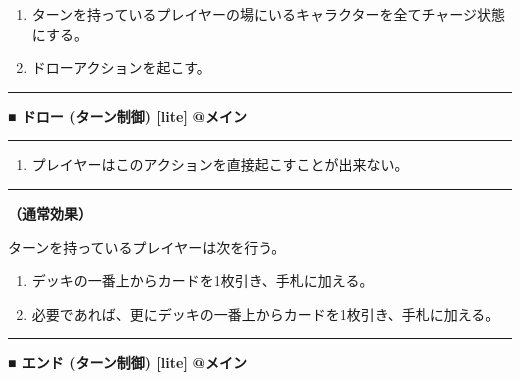 \documentclass[twocolumn,a5paper,papersize,10pt]{jarticle}
\begin{document}
\vspace{-1zh}%
\begin{enumerate}
\setlength{\leftskip}{-0.3cm}
\setlength{\parskip}{0pt} %

\item ターンを持っているプレイヤーの場にいるキャラクターを全てチャージ状態にする。

\item ドローアクションを起こす。
\vspace{-1zh}%
\end{enumerate}
\vspace{2mm} %
\hrule height 0.5mm depth 0mm width 66.5mm %
\vspace{1mm} %
{\normalsize\bf ■ ドロー {\scriptsize (ターン制御) [lite]}} %
\hfill 
{\small\bf @メイン }


\vspace{1mm}%
\hrule height 0.1mm depth 0mm width 66.5mm %
\vspace{1mm}%


\vspace{-1zh}%
\begin{enumerate}
\renewcommand{\labelenumi}{※}
\setlength{\leftskip}{-0.3cm}
\setlength{\itemsep}{0pt} %
\setlength{\parskip}{0pt} %

\item プレイヤーはこのアクションを直接起こすことが出来ない。

\vspace{-3mm}%
\end{enumerate}
\vspace{1mm}%
\hrule height 0.1mm depth 0mm width 66.5mm %
\vspace{1mm}%

{\bf（通常効果）}

ターンを持っているプレイヤーは次を行う。


\vspace{-1zh}%
\begin{enumerate}
\setlength{\leftskip}{-0.3cm}
\setlength{\parskip}{0pt} %

\item デッキの一番上からカードを1枚引き、手札に加える。

\item 必要であれば、更にデッキの一番上からカードを1枚引き、手札に加える。
\vspace{-1zh}%
\end{enumerate}
\vspace{2mm} %
\hrule height 0.5mm depth 0mm width 66.5mm %
\vspace{1mm} %
{\normalsize\bf ■ エンド {\scriptsize (ターン制御) [lite]}} %
\hfill 
{\small\bf @メイン }
\end{document}
